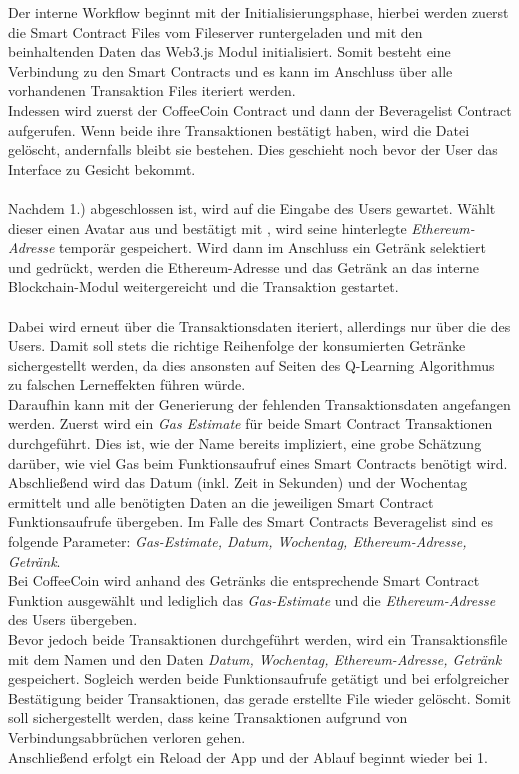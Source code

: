 Der interne Workflow beginnt mit der Initialisierungsphase, hierbei werden zuerst die Smart Contract Files vom Fileserver runtergeladen und mit den beinhaltenden Daten das Web3.js Modul initialisiert. Somit besteht eine Verbindung zu den Smart Contracts und es kann im Anschluss über alle vorhandenen Transaktion Files iteriert werden. \\
Indessen wird zuerst der CoffeeCoin Contract und dann der Beveragelist Contract aufgerufen. Wenn beide ihre Transaktionen bestätigt haben, wird die Datei gelöscht, andernfalls bleibt sie bestehen. Dies geschieht noch bevor der User das Interface zu Gesicht bekommt.\\\\
Nachdem 1.) abgeschlossen ist, wird auf die Eingabe des Users gewartet. Wählt dieser einen Avatar aus und bestätigt mit , wird seine hinterlegte \textit{Ethereum-Adresse} temporär gespeichert. Wird dann im Anschluss ein Getränk selektiert und  gedrückt, werden die Ethereum-Adresse und das Getränk an das interne Blockchain-Modul weitergereicht und die Transaktion gestartet. \\\\
Dabei wird erneut über die Transaktionsdaten iteriert, allerdings nur über die des Users. Damit soll stets die richtige Reihenfolge der konsumierten Getränke sichergestellt werden, da dies ansonsten auf Seiten des Q-Learning Algorithmus zu falschen Lerneffekten führen würde.\\
Daraufhin kann mit der Generierung der fehlenden Transaktionsdaten angefangen werden. Zuerst wird ein \textit{Gas Estimate} für beide Smart Contract Transaktionen durchgeführt. Dies ist, wie der Name bereits impliziert, eine grobe Schätzung darüber, wie viel Gas beim Funktionsaufruf eines Smart Contracts benötigt wird. \\
Abschließend wird das Datum (inkl. Zeit in Sekunden) und der Wochentag ermittelt und alle benötigten Daten an die jeweiligen Smart Contract Funktionsaufrufe übergeben. Im Falle des Smart Contracts Beveragelist sind es folgende Parameter: \textit{Gas-Estimate, Datum, Wochentag, Ethereum-Adresse, Getränk}.\\
Bei CoffeeCoin wird anhand des Getränks die entsprechende Smart Contract Funktion ausgewählt und lediglich das \textit{Gas-Estimate} und die \textit{Ethereum-Adresse} des Users übergeben.\\
Bevor jedoch beide Transaktionen durchgeführt werden, wird ein Transaktionsfile mit dem Namen  und den Daten \textit{Datum, Wochentag, Ethereum-Adresse, Getränk} gespeichert. Sogleich werden beide Funktionsaufrufe getätigt und bei erfolgreicher Bestätigung beider Transaktionen, das gerade erstellte File wieder gelöscht. Somit soll sichergestellt werden, dass keine Transaktionen aufgrund von Verbindungsabbrüchen verloren gehen. \\
Anschließend erfolgt ein Reload der App und der Ablauf beginnt wieder bei 1.